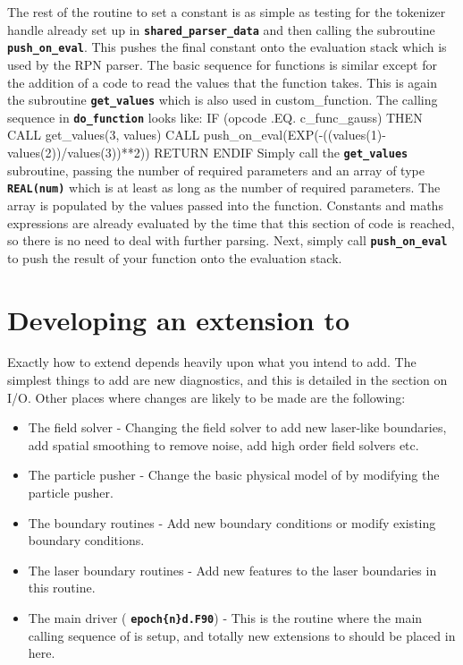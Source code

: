 \documentclass[12pt,a4paper]{article}
\newcommand{\inlinecode}[1]{{\color{warwickred} \bf\texttt{#1}}}
\newcommand{\EPOCH}{{\color{warwickdark}\fontfamily{phv}\selectfont{EPOCH}}}
\newenvironment{boxverbatim}{\lboxverbatim{none}}{\endlboxverbatim}
\begin{document}
The rest of the routine to set a constant is as simple as testing for the
tokenizer handle already set up in \inlinecode{shared\_parser\_data} and then
calling the subroutine \inlinecode{push\_on\_eval}. This pushes the final
constant onto the evaluation stack which is used by the RPN parser. The basic
sequence for functions is similar except for the addition of a code to read
the values that the function takes. This is again the subroutine
\inlinecode{get\_values} which is also used in custom\_function. The calling
sequence in \inlinecode{do\_function} looks like:
\begin{boxverbatim}
  IF (opcode .EQ. c_func_gauss) THEN
    CALL get_values(3, values)
    CALL push_on_eval(EXP(-((values(1)-values(2))/values(3))**2))
    RETURN
  ENDIF
\end{boxverbatim}
Simply call the \inlinecode{get\_values} subroutine, passing the number of
required parameters and an array of type \inlinecode{REAL(num)} which is at
least as long as the number of required parameters. The array is populated
by the values passed into the function. Constants and maths expressions are
already evaluated by the time that this section of code is reached, so there is
no need to deal with further parsing. Next, simply call
\inlinecode{push\_on\_eval} to push the result of your function onto the
evaluation stack.

\section{Developing an extension to {\EPOCH}}

Exactly how to extend {\EPOCH} depends heavily upon what you intend to add. The
simplest things to add are new diagnostics, and this is detailed in
the section on {\EPOCH} I/O. Other places where changes are likely to be made
are the following:
\begin{itemize}
\item The field solver - Changing the field solver to add new laser-like
  boundaries, add spatial smoothing to remove noise, add high order field
  solvers etc.
\item The particle pusher - Change the basic physical model of {\EPOCH} by
  modifying the particle pusher.
\item The boundary routines - Add new boundary conditions or modify existing
  boundary conditions.
\item The laser boundary routines - Add new features to the laser boundaries in
  this routine.
\item The main driver (\inlinecode{epoch\{n\}d.F90}) - This is the routine
  where the main calling sequence of {\EPOCH} is setup, and totally new
  extensions to {\EPOCH} should be placed in here.
\end{itemize}
\end{document}

